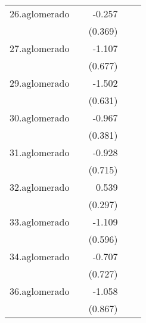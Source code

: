 {\begin{longtable}{l*{4}{D{.}{.}{-1}}}
\addlinespace
26.aglomerado&                     &      -0.257         &                     &                     \\
            &                     &     (0.369)         &                     &                     \\
\addlinespace
27.aglomerado&                     &      -1.107         &                     &                     \\
            &                     &     (0.677)         &                     &                     \\
\addlinespace
29.aglomerado&                     &      -1.502\sym{*}  &                     &                     \\
            &                     &     (0.631)         &                     &                     \\
\addlinespace
30.aglomerado&                     &      -0.967\sym{*}  &                     &                     \\
            &                     &     (0.381)         &                     &                     \\
\addlinespace
31.aglomerado&                     &      -0.928         &                     &                     \\
            &                     &     (0.715)         &                     &                     \\
\addlinespace
32.aglomerado&                     &       0.539         &                     &                     \\
            &                     &     (0.297)         &                     &                     \\
\addlinespace
33.aglomerado&                     &      -1.109         &                     &                     \\
            &                     &     (0.596)         &                     &                     \\
\addlinespace
34.aglomerado&                     &      -0.707         &                     &                     \\
            &                     &     (0.727)         &                     &                     \\
\addlinespace
36.aglomerado&                     &      -1.058         &                     &                     \\
            &                     &     (0.867)         &                     &                     \\

\end{longtable}}
